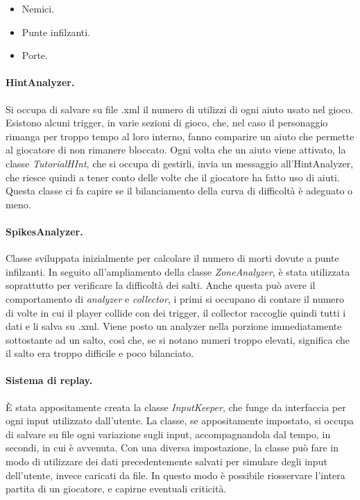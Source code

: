 \begin{itemize}
	\item Nemici.
	\item Punte infilzanti.
	\item Porte.
\end{itemize}

\paragraph{HintAnalyzer.}
\label{par:hint_analyzer}
Si occupa di salvare su file .xml il numero di utilizzi di ogni aiuto usato nel gioco. Esistono alcuni trigger, in varie sezioni di gioco, che, nel caso il personaggio rimanga per troppo tempo al loro interno, fanno comparire un aiuto che permette al giocatore di non rimanere bloccato. Ogni volta che un aiuto viene attivato, la classe \textit{TutorialHInt}, che si occupa di gestirli, invia un messaggio all’HintAnalyzer, che riesce quindi a tener conto delle volte che il giocatore ha fatto uso di aiuti. Questa classe ci fa capire se il bilanciamento della curva di difficoltà è adeguato o meno.

\paragraph{SpikesAnalyzer.}
\label{par:spikes_analyzer}
Classe sviluppata inizialmente per calcolare il numero di morti dovute a punte infilzanti. In seguito all’ampliamento della classe \textit{ZoneAnalyzer}, è stata utilizzata soprattutto per verificare la difficoltà dei salti. Anche questa può avere il comportamento di \textit{analyzer} e \textit{collector}, i primi si occupano di contare il numero di volte in cui il player collide con dei trigger, il collector raccoglie quindi tutti i dati e li salva su .xml. Viene posto un analyzer nella porzione immediatamente sottostante ad un salto, così che, se si notano numeri troppo elevati, significa che il salto era troppo difficile e poco bilanciato.

\paragraph{Sistema di replay.}
\label{par:replay}
È stata appositamente creata la classe \textit{InputKeeper}, che funge da interfaccia per ogni input utilizzato dall’utente. La classe, se appositamente impostato, si occupa di salvare su file ogni variazione sugli input, accompagnandola dal tempo, in secondi, in cui è avvenuta. Con una diversa impostazione, la classe può fare in modo di utilizzare dei dati precedentemente salvati per simulare degli input dell’utente, invece caricati da file. In questo modo è possibile riosservare l’intera partita di un giocatore, e capirne eventuali criticità.

